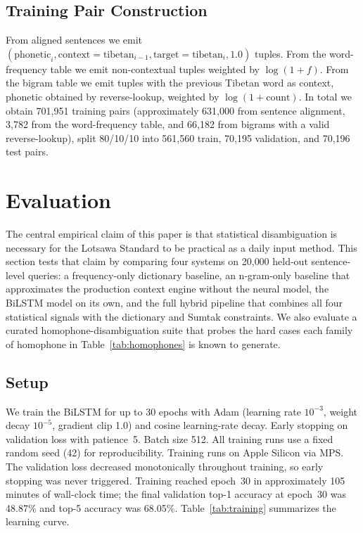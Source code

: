 \documentclass[11pt]{article}
\begin{document}
\subsection{Training Pair Construction}

From aligned sentences we emit $(\text{phonetic}_i, \text{context}=\text{tibetan}_{i-1}, \text{target}=\text{tibetan}_i, 1.0)$ tuples. From the word-frequency table we emit non-contextual tuples weighted by $\log(1+f)$. From the bigram table we emit tuples with the previous Tibetan word as context, phonetic obtained by reverse-lookup, weighted by $\log(1+\text{count})$. In total we obtain 701{,}951 training pairs (approximately 631{,}000 from sentence alignment, 3{,}782 from the word-frequency table, and 66{,}182 from bigrams with a valid reverse-lookup), split 80/10/10 into 561{,}560 train, 70{,}195 validation, and 70{,}196 test pairs.

\section{Evaluation}
\label{sec:eval}

The central empirical claim of this paper is that statistical disambiguation is necessary for the Lotsawa Standard to be practical as a daily input method. This section tests that claim by comparing four systems on 20{,}000 held-out sentence-level queries: a frequency-only dictionary baseline, an n-gram-only baseline that approximates the production context engine without the neural model, the BiLSTM model on its own, and the full hybrid pipeline that combines all four statistical signals with the dictionary and Sumtak constraints. We also evaluate a curated homophone-disambiguation suite that probes the hard cases each family of homophone in Table~\ref{tab:homophones} is known to generate.

\subsection{Setup}

We train the BiLSTM for up to 30 epochs with Adam (learning rate $10^{-3}$, weight decay $10^{-5}$, gradient clip 1.0) and cosine learning-rate decay. Early stopping on validation loss with patience~5. Batch size 512. All training runs use a fixed random seed (42) for reproducibility. Training runs on Apple Silicon via MPS. The validation loss decreased monotonically throughout training, so early stopping was never triggered. Training reached epoch~30 in approximately 105 minutes of wall-clock time; the final validation top-1 accuracy at epoch~30 was 48.87\% and top-5 accuracy was 68.05\%. Table~\ref{tab:training} summarizes the learning curve.
\end{document}
